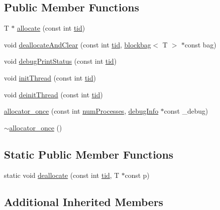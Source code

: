 \subsection*{Public Member Functions}
\begin{DoxyCompactItemize}
\item 
T $\ast$ \hyperlink{classallocator__once_abfd2798c921320154252d3c16f67e434}{allocate} (const int \hyperlink{microbench_2main_8cpp_a9ca9869868fe7e7a38a921cc7de4103f}{tid})
\item 
void \hyperlink{classallocator__once_a311dcf7b1c2d5792b1bc8ce418ab9b42}{deallocate\+And\+Clear} (const int \hyperlink{microbench_2main_8cpp_a9ca9869868fe7e7a38a921cc7de4103f}{tid}, \hyperlink{classblockbag}{blockbag}$<$ T $>$ $\ast$const bag)
\item 
void \hyperlink{classallocator__once_ad50c51979d7260a86334c3df79b3d55e}{debug\+Print\+Status} (const int \hyperlink{microbench_2main_8cpp_a9ca9869868fe7e7a38a921cc7de4103f}{tid})
\item 
void \hyperlink{classallocator__once_a700c4f8c603d07b26435da98425e2cb8}{init\+Thread} (const int \hyperlink{microbench_2main_8cpp_a9ca9869868fe7e7a38a921cc7de4103f}{tid})
\item 
void \hyperlink{classallocator__once_a8dd2989cbd49008d5faa43d03c930e0e}{deinit\+Thread} (const int \hyperlink{microbench_2main_8cpp_a9ca9869868fe7e7a38a921cc7de4103f}{tid})
\item 
\hyperlink{classallocator__once_ac67f48c32b2da6477d56ff602b8aeb0a}{allocator\+\_\+once} (const int \hyperlink{testing_8cpp_aa085812188e21ede75351d88b9b2c30d}{num\+Processes}, \hyperlink{classdebugInfo}{debug\+Info} $\ast$const \+\_\+debug)
\item 
\hyperlink{classallocator__once_a61d85b93659618b4777498ba7e20c872}{$\sim$allocator\+\_\+once} ()
\end{DoxyCompactItemize}
\subsection*{Static Public Member Functions}
\begin{DoxyCompactItemize}
\item 
static void \hyperlink{classallocator__once_a7fbe0cd20adb62e1c160cecc98bcc257}{deallocate} (const int \hyperlink{microbench_2main_8cpp_a9ca9869868fe7e7a38a921cc7de4103f}{tid}, T $\ast$const p)
\end{DoxyCompactItemize}
\subsection*{Additional Inherited Members}


